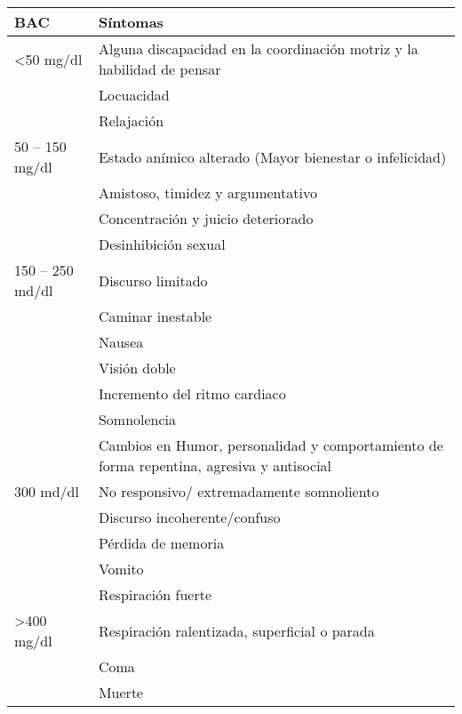 \begin{table}[ht]
    \noindent \centering \resizebox{\textwidth}{!}
    {        
        \begin{tabular}{|l|l|}
            \hline
                BAC & Síntomas \\
            \hline
                \textless 50 mg/dl & Alguna discapacidad en la coordinación motriz y la habilidad de pensar \\
                           & Locuacidad \\
                           & Relajación \\
            \hline
                50 – 150 mg/dl & Estado anímico alterado (Mayor bienestar o infelicidad) \\
                               & Amistoso, timidez y argumentativo \\
                               & Concentración y juicio deteriorado \\
                               & Desinhibición sexual \\
        
            \hline
                150 – 250 md/dl & Discurso limitado \\
                                & Caminar inestable \\
                                & Nausea \\
                                & Visión doble \\
                                & Incremento del ritmo cardiaco \\
                                & Somnolencia \\
                                & Cambios en Humor, personalidad y comportamiento de forma repentina, agresiva y antisocial \\
        
            \hline
                300 md/dl & No responsivo/ extremadamente somnoliento \\
                          & Discurso incoherente/confuso \\
                          & Pérdida de memoria \\
                          & Vomito \\
                          & Respiración fuerte \\
        
            \hline
                \textgreater 400 mg/dl & Respiración ralentizada, superficial o parada \\
                            & Coma \\
                            & Muerte \\
        
            \hline
        \end{tabular}
    }
     \label{tab:sintomas_niveles} 
\end{table}
